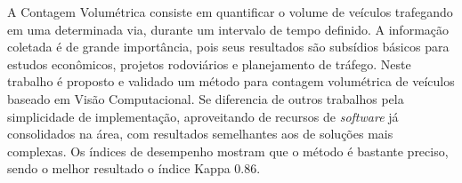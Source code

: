 
A Contagem Volumétrica consiste em quantificar o volume de veículos trafegando em uma determinada via, durante um intervalo de tempo definido. A informação coletada é de grande importância, pois seus resultados são subsídios básicos para estudos econômicos, projetos rodoviários e planejamento de tráfego. Neste trabalho é proposto e validado um método para contagem volumétrica de veículos baseado em Visão Computacional. Se diferencia de outros trabalhos pela simplicidade de implementação, aproveitando de recursos de \textit{software} já consolidados na área, com resultados semelhantes aos de soluções mais complexas. Os índices de desempenho mostram que o método é bastante preciso, sendo o melhor resultado o índice Kappa $0.86$.


